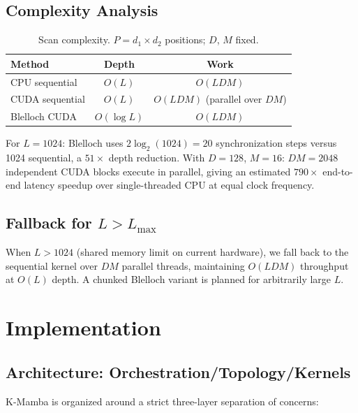 \documentclass[10pt,onecolumn]{article}
\begin{document}
\subsection{Complexity Analysis}

\begin{table}[htbp]
\centering
\caption{Scan complexity. $P = d_1 \times d_2$ positions; $D$, $M$ fixed.}
\label{tab:complexity}
\begin{tabular}{lcc}
\toprule
Method & Depth & Work \\
\midrule
CPU sequential & $O(L)$ & $O(LDM)$ \\
CUDA sequential & $O(L)$ & $O(LDM)$ (parallel over $DM$) \\
Blelloch CUDA & $O(\log L)$ & $O(LDM)$ \\
\bottomrule
\end{tabular}
\end{table}

For $L = 1024$: Blelloch uses $2\log_2(1024) = 20$ synchronization steps
versus 1024 sequential, a $51\times$ depth reduction.
With $D = 128$, $M = 16$: $DM = 2048$ independent CUDA blocks execute in
parallel, giving an estimated $790\times$ end-to-end latency speedup over
single-threaded CPU at equal clock frequency.

\subsection{Fallback for $L > L_{\max}$}

When $L > 1024$ (shared memory limit on current hardware), we fall back
to the sequential kernel over $DM$ parallel threads, maintaining
$O(LDM)$ throughput at $O(L)$ depth. A chunked Blelloch variant
is planned for arbitrarily large $L$.

\section{Implementation}
\label{sec:implementation}

\subsection{Architecture: Orchestration/Topology/Kernels}

K-Mamba is organized around a strict three-layer separation of concerns:
\end{document}
